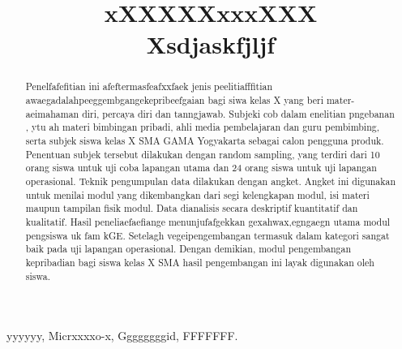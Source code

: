 \documentclass[conference]{IEEEtran}
\begin{document}
\makeatletter
\newcommand{\linebreakand}{%
  \end{@IEEEauthorhalign}
  \hfill\mbox{}\par
  \mbox{}\hfill\begin{@IEEEauthorhalign}
}
\makeatother

\title{xXXXXXxxxXXX
\\ Xsdjaskfjljf}
\author{
    \and
    \and
    }
\maketitle


\begin{abstract}
    Penelfafefitian ini afeftermasfeafxxfaek jenis peelitiafffitian awaegadalahpeeggembgangekepribeefgaian bagi siwa kelas X yang beri mater-aeimahaman diri, percaya diri dan tanngjawab. Subjeki cob dalam enelitian pngebanan  , ytu ah materi bimbingan pribadi, ahli media pembelajaran dan guru pembimbing, serta subjek siswa kelas X SMA GAMA Yogyakarta sebagai calon pengguna produk. Penentuan subjek tersebut dilakukan dengan random sampling, yang terdiri dari 10 orang siswa untuk uji coba lapangan utama dan 24 orang siswa untuk uji lapangan operasional. Teknik pengumpulan data dilakukan dengan angket. Angket ini digunakan untuk menilai modul yang dikembangkan dari segi kelengkapan modul, isi materi maupun tampilan fisik modul. Data dianalisis secara deskriptif kuantitatif dan kualitatif.
    Hasil peneliaefaefiange menunjufafgekkan gexahwax,egngaegn utama modul pengsiswa uk fam kGE. Setelagh vegeipengembangan termasuk dalam kategori sangat baik pada uji lapangan operasional. Dengan demikian, modul pengembangan kepribadian bagi siswa kelas X SMA hasil pengembangan ini layak digunakan oleh siswa.
\end{abstract}
\begin{IEEEkeywords}
    yyyyyy, Micrxxxxo-x, Ggggggggid, FFFFFFF.
\end{IEEEkeywords}
\end{document}

